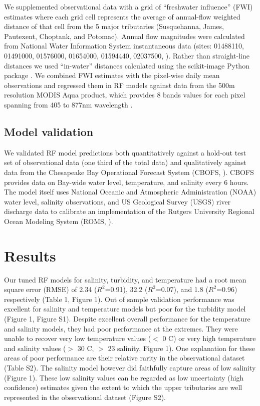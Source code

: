 \documentclass{article}
\begin{document}
We supplemented observational data with a grid of “freshwater influence” (FWI) estimates where each grid cell represents the average of annual-flow weighted distance of that cell from the 5 major tributaries (Susquehanna, James, Pautexent, Choptank, and Potomac). Annual flow magnitudes were calculated from National Water Information System instantaneous data (sites: 01488110, 01491000, 01576000, 01654000, 01594440, 02037500, \citet{nwis2021usgs}). Rather than straight-line distances we used “in-water” distances calculated using the scikit-image Python package \citep{littleKrigingEstuariesCrow1997,vanderwaltScikitimageImageProcessing2014}. We combined FWI estimates with the pixel-wise daily mean observations and regressed them in RF models against data from the 500m resolution MODIS Aqua product, which provides 8 bands values for each pixel spanning from 405 to 877nm wavelength \citep{vermoteericMOD09GAMODISTerra2015}.


\subsection{Model validation}

We validated RF model predictions both quantitatively against a hold-out test set of observational data (one third of the total data) and qualitatively against data from the Chesapeake Bay Operational Forecast System (CBOFS, \citet{lanerolle2011second}). CBOFS provides data on Bay-wide water level, temperature, and salinity every 6 hours. The model itself uses National Oceanic and Atmospheric Administration (NOAA) water level, salinity observations, and US Geological Survey (USGS) river discharge data to calibrate an implementation of the Rutgers University Regional Ocean Modeling System (ROMS, \citet{shchepetkinRegionalOceanicModeling2005}).


\section{Results}

Our tuned RF models for salinity, turbidity, and temperature had a root mean square error (RMSE) of 2.34 ($R^2$=0.91), 32.2 ($R^2$=0.07), and 1.8 ($R^2$=0.96) respectively (Table 1, Figure 1). Out of sample validation performance was excellent for salinity and temperature models but poor for the turbidity model (Figure 1, Figure S1). Despite excellent overall performance for the temperature and salinity models, they had poor performance at the extremes. They were unable to recover very low temperature values ($<$ 0 C) or very high temperature and salinity values ($>$ 30 C, $>$ 23 salinity, Figure 1). One explanation for these areas of poor performance are their relative rarity in the observational dataset (Table S2). The salinity model however did faithfully capture areas of low salinity (Figure 1). These low salinity values can be regarded as low uncertainty (high confidence) estimates given the extent to which the upper tributaries are well represented in the observational dataset (Figure S2).
\end{document}
